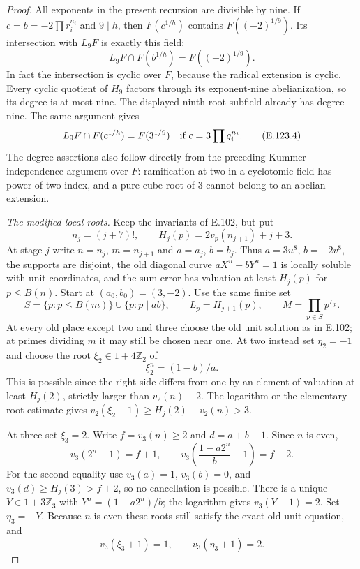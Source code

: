 \begin{proof}
All exponents in the present recursion are divisible by nine.
If $c=b=-2\prod r_i^{n_i}$ and $9\mid h$, then $F(c^{1/h})$
contains $F((-2)^{1/9})$. Its intersection with $L_9F$ is
exactly this field:
\[
 L_9F\cap F(b^{1/h})=F((-2)^{1/9}).
 \tag{E.123.3}
\]
In fact the intersection is cyclic over $F$, because the radical
extension is cyclic. Every cyclic quotient of $H_9$ factors
through its exponent-nine abelianization, so its degree is at
most nine. The displayed ninth-root subfield already has degree
nine. The same argument gives
\[
 L_9F\cap F(c^{1/h})=F(3^{1/9})
 \quad\hbox{if }c=3\prod q_i^{n_i}.
 \tag{E.123.4}
\]
The degree assertions also follow directly from the preceding
Kummer independence argument over $F$: ramification at two in
a cyclotomic field has power-of-two index, and a pure cube root
of $3$ cannot belong to an abelian extension.

\emph{The modified local roots.}
Keep the invariants of E.102, but put
\[
 n_j=(j+7)!,\qquad
 H_j(p)=2v_p(n_{j+1})+j+3.
\]
At stage $j$ write $n=n_j$, $m=n_{j+1}$ and $a=a_j$, $b=b_j$.
Thus $a=3u^8$, $b=-2v^8$, the supports are disjoint, the old
diagonal curve $aX^n+bY^n=1$ is locally soluble with unit
coordinates, and the sum error has valuation at least $H_j(p)$
for $p\leq B(n)$. Start at $(a_0,b_0)=(3,-2)$.
Use the same finite set
\[
 S=\{p:p\leq B(m)\}\cup\{p:p\mid ab\},
 \qquad L_p=H_{j+1}(p),\qquad
 M=\prod_{p\in S}p^{L_p}.
\]
At every old place except two and three choose the old unit
solution as in E.102; at primes dividing $m$ it may still be
chosen near one. At two instead set $\eta_2=-1$ and choose
the root $\xi_2\in1+4\mathbb Z_2$ of
\[
 \xi_2^n=(1-b)/a.
\]
This is possible since the right side differs from one by an
element of valuation at least $H_j(2)$, strictly larger than
$v_2(n)+2$. The logarithm or the elementary root estimate gives
$v_2(\xi_2-1)\geq H_j(2)-v_2(n)>3$.

At three set $\xi_3=2$. Write $f=v_3(n)\geq2$ and
$d=a+b-1$. Since $n$ is even,
\[
 v_3(2^n-1)=f+1,
 \qquad
 v_3\left(\frac{1-a2^n}{b}-1\right)=f+2.
 \tag{E.123.5}
\]
For the second equality use $v_3(a)=1$, $v_3(b)=0$, and
$v_3(d)\geq H_j(3)>f+2$, so no cancellation is possible.
There is a unique $Y\in1+3\mathbb Z_3$ with
$Y^n=(1-a2^n)/b$; the logarithm gives $v_3(Y-1)=2$.
Set $\eta_3=-Y$. Because $n$ is even these roots still satisfy
the exact old unit equation, and
\[
 v_3(\xi_3+1)=1,\qquad v_3(\eta_3+1)=2.
 \tag{E.123.6}
\]


\end{proof}
